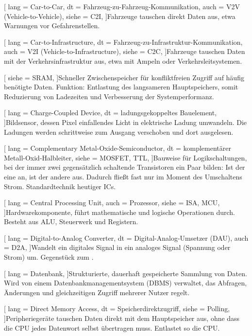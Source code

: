 [
  lang  = Car-to-Car,
  dt    = Fahrzeug-zu-Fahrzeug-Kommunikation,
  auch  = V2V (Vehicle-to-Vehicle),
  siehe = C2I,
]{Fahrzeuge tauschen direkt Daten aus, etwa Warnungen vor Gefahrenstellen.}

[
  lang  = Car-to-Infrastructure,
  dt    = Fahrzeug-zu-Infrastruktur-Kommunikation,
  auch  = V2I (Vehicle-to-Infrastructure),
  siehe = C2C,
]{Fahrzeuge tauschen Daten mit der Verkehrsinfrastruktur aus, etwa mit Ampeln oder Verkehrsleitsystemen.}

[
  siehe = SRAM,
]{Schneller Zwischenspeicher für konfliktfreien Zugriff auf häufig benötigte Daten. Funktion: Entlastung des langsameren Hauptspeichers, somit Reduzierung von Ladezeiten und Verbesserung der Systemperformanz.}

[
  lang  = Charge-Coupled Device,
  dt    = ladungsgekoppeltes Bauelement,
]{Bildsensor, dessen Pixel einfallendes Licht in elektrische Ladung umwandeln. Die Ladungen werden schrittweise zum Ausgang verschoben und dort ausgelesen.}

[
  lang  = Complementary Metal-Oxide-Semiconductor,
  dt    = komplementärer Metall-Oxid-Halbleiter,
  siehe = {MOSFET, TTL},
]{Bauweise für Logikschaltungen, bei der immer zwei gegensätzlich schaltende Transistoren ein Paar bilden: Ist der eine an, ist der andere aus. Dadurch fließt fast nur im Moment des Umschaltens Strom. Standardtechnik heutiger ICs.}

[
  lang  = Central Processing Unit,
  auch  = Prozessor,
  siehe = {ISA, MCU},
]{Hardwarekomponente, führt mathematische und logische Operationen durch. Besteht aus ALU, Steuerwerk und Registern.}

[
  lang  = Digital-to-Analog Converter,
  dt    = Digital-Analog-Umsetzer (DAU),
  auch  = D2A,
]{Wandelt ein digitales Signal in ein analoges Signal (Spannung oder Strom) um. Gegenstück zum .}

[
  lang  = Datenbank,
]{Strukturierte, dauerhaft gespeicherte Sammlung von Daten. Wird von einem Datenbankmanagementsystem (DBMS) verwaltet, das Abfragen, Änderungen und gleichzeitigen Zugriff mehrerer Nutzer regelt.}

[
  lang  = Direct Memory Access,
  dt    = Speicherdirektzugriff,
  siehe = Polling,
]{Peripheriegeräte tauschen Daten direkt mit dem Hauptspeicher aus, ohne dass die CPU jedes Datenwort selbst übertragen muss. Entlastet so die CPU.}

